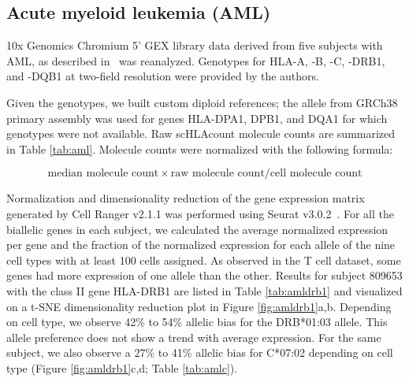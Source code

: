 \documentclass{article}[12pt]
\begin{document}
\subsection*{Acute myeloid leukemia (AML)}

10x Genomics Chromium 5' GEX library data derived from five subjects with AML, as described in~\parencite{Petti2019} was reanalyzed. Genotypes for HLA-A, -B, -C, -DRB1, and -DQB1 at two-field resolution were provided by the authors.

Given the genotypes, we built custom diploid references; the allele from GRCh38 primary assembly was used for genes HLA-DPA1, DPB1, and DQA1 for which genotypes were not available. Raw scHLAcount molecule counts are summarized in Table \ref{tab:aml}. Molecule counts were normalized with the following formula: 

\[
\text{median molecule count} \times \text{raw molecule count} / \text{cell molecule count}
\]

Normalization and dimensionality reduction of the gene expression matrix generated by Cell Ranger v2.1.1 was performed using Seurat v3.0.2~\parencite{Stuart2019}. For all the biallelic genes in each subject, we calculated the average normalized expression per gene and the fraction of the normalized expression for each allele of the nine cell types with at least 100 cells assigned. As observed in the T cell dataset, some genes had more expression of one allele than the other. Results for subject 809653 with the class II gene HLA-DRB1 are listed in Table \ref{tab:amldrb1} and visualized on a t-SNE dimensionality reduction plot in Figure \ref{fig:amldrb1}a,b. Depending on cell type, we observe 42\% to 54\% allelic bias for the DRB*01:03 allele. This allele preference does not show a trend with average expression. For the same subject, we also observe a 27\% to 41\% allelic bias for C*07:02 depending on cell type (Figure \ref{fig:amldrb1}c,d; Table \ref{tab:amlc}).
\end{document}
